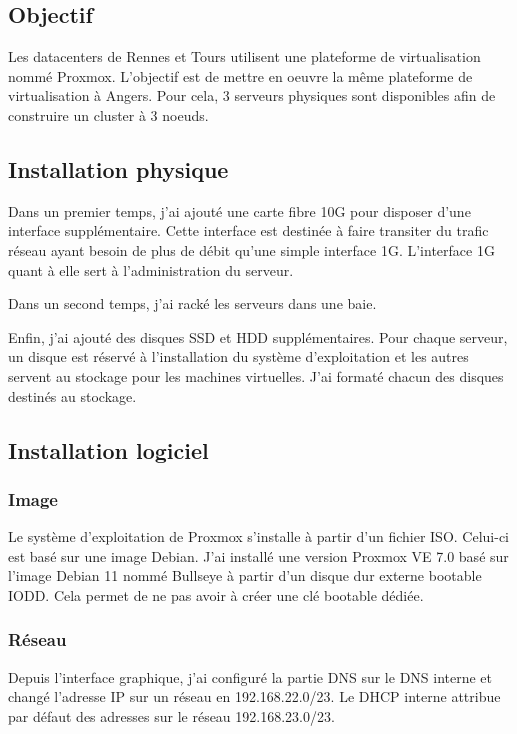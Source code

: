 \documentclass[12pt, a4paper, twoside]{article}
\begin{document}
\subsection{Objectif}
Les datacenters de Rennes et Tours utilisent une plateforme de virtualisation nommé \gls{Proxmox}. 
L'objectif est de mettre en oeuvre la même plateforme de virtualisation à Angers. 
Pour cela, 3 serveurs physiques sont disponibles afin de construire un \gls{cluster} à 3 noeuds.

\subsection{Installation physique}
Dans un premier temps, j'ai ajouté une carte fibre 10G pour disposer d'une interface supplémentaire. 
Cette interface est destinée à faire transiter du trafic réseau ayant besoin de plus de débit qu'une simple interface 1G. 
L'interface 1G quant à elle sert à l'administration du serveur.

Dans un second temps, j'ai racké les serveurs dans une baie. 

Enfin, j'ai ajouté des disques \gls{SSD} et \gls{HDD} supplémentaires.
Pour chaque serveur, un disque est réservé à l'installation du système d'exploitation et les autres servent au stockage pour les machines virtuelles.
J'ai formaté chacun des disques destinés au stockage.

\subsection{Installation logiciel}
\subsubsection{Image}
Le système d'exploitation de \gls{Proxmox} s'installe à partir d'un fichier \gls{ISO}. 
Celui-ci est basé sur une image \gls{Debian}. 
J'ai installé une version \gls{Proxmox} VE 7.0 basé sur l'image \gls{Debian} 11 nommé Bullseye à partir d'un disque dur externe bootable IODD. 
Cela permet de ne pas avoir à créer une clé bootable dédiée.

\subsubsection{Réseau}
Depuis l'interface graphique, j'ai configuré la partie \gls{DNS} sur le \gls{DNS} interne et changé l'adresse \gls{IP} sur un réseau en 192.168.22.0/23. 
Le DHCP interne attribue par défaut des adresses sur le réseau 192.168.23.0/23.
\end{document}
